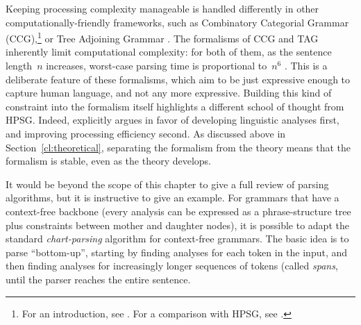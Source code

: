 \documentclass[output=paper,nonflat]{langsci/langscibook}
\begin{document}
Keeping processing complexity manageable is handled differently
in other computationally-friendly frameworks,
such as Combinatory Categorial Grammar (CCG),\footnote{%
	For an introduction, see \citet{steedman2011ccg}.
	For a comparison with HPSG, see .
}
or Tree Adjoining Grammar \citep[TAG;][]{Joshi87a-u,SAJ88a-u}.
The formalisms of CCG and TAG inherently limit computational complexity:
for both of them, as the sentence length~$n$ increases,
worst-case parsing time is proportional to~$n^6$ \citep{Kasamietal1989}.
This is a deliberate feature of these formalisms,
which aim to be just expressive enough to capture human language,
and not any more expressive.
Building this kind of constraint into the formalism itself
highlights a different school of thought from HPSG.
Indeed, \citet[64]{MuellerCoreGram} explicitly argues
in favor of developing linguistic analyses first,
and improving processing efficiency second.
As discussed above in Section~\ref{cl:theoretical},
separating the formalism from the theory
means that the formalism is stable, even as the theory develops.


It would be beyond the scope of this chapter
to give a full review of parsing algorithms,
but it is instructive to give an example.
For grammars that have a context-free backbone
(every analysis can be expressed as a phrase-structure tree
plus constraints between mother and daughter nodes),
it is possible to adapt the standard \textit{chart-parsing} algorithm \cite{kay:1973} for context-free grammars.
The basic idea is to parse ``bottom-up'',
starting by finding analyses for each token in the input,
and then finding analyses for increasingly longer sequences of tokens (called \textit{spans},
until the parser reaches the entire sentence.
\end{document}
